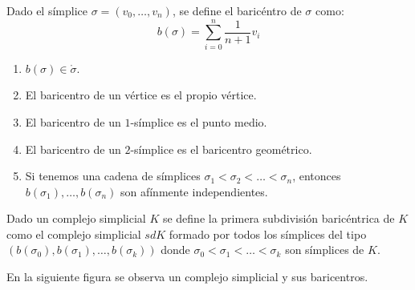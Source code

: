 \documentclass[HS.tex]{subfiles}
\begin{document}
\begin{defi}
Dado el símplice $σ = (v_0,\dots,v_n)$, se define el baricéntro de $σ$ como:
\[ b(σ) = \sum_{i=0}^n \frac{1}{n+1}v_i \]
\end{defi}

\begin{nota}
\begin{enumerate}
\item $b(σ) \in \mathring{σ}$.
\item El baricentro de un vértice es el propio vértice.
\item El baricentro de un $1$-símplice es el punto medio.
\item El baricentro de un $2$-símplice es el baricentro geométrico.
\item Si tenemos una cadena de símplices $σ_1<σ_2<\dots<σ_n$, entonces $b(σ_1),\dots,b(σ_n)$ son afínmente independientes.
\end{enumerate}
\end{nota}

\begin{defi}
Dado un complejo simplicial $K$ se define la primera subdivisión baricéntrica de $K$ como el complejo simplicial $sd K$ formado por todos los símplices del tipo $(b(σ_0),b(σ_1),\dots,b(σ_k))$ donde $σ_0 < σ_1 <\dots <σ_k$ son símplices de $K$.
\end{defi}
\begin{ej}
En la siguiente figura se observa un complejo simplicial y sus baricentros.
\begin{figure}[H]
\centering
{}
\end{figure}
\end{ej}
\end{document}
